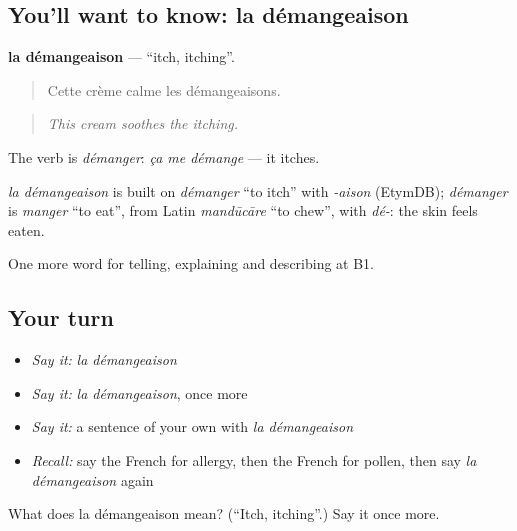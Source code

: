 \subsection*{You'll want to know: la démangeaison}
\textbf{la démangeaison} — \textquotedblleft{}itch, itching\textquotedblright{}.

\begin{quote}
Cette crème calme les démangeaisons.
\end{quote}

\begin{quote}
\emph{This cream soothes the itching.}
\end{quote}

The verb is \emph{démanger}: \emph{ça me démange} — it itches.

\begin{cousinweb}
\emph{la démangeaison} is built on \emph{démanger} \textquotedblleft{}to itch\textquotedblright{} with \emph{-aison} (EtymDB); \emph{démanger} is \emph{manger} \textquotedblleft{}to eat\textquotedblright{}, from Latin \emph{mandūcāre} \textquotedblleft{}to chew\textquotedblright{}, with \emph{dé-}: the skin feels eaten.
\end{cousinweb}

\begin{grammarlens}[title={What you've built}]
One more word for telling, explaining and describing at B1.
\end{grammarlens}

\subsection*{Your turn}
\begin{itemize}
\raggedright
  \item \emph{Say it:} \emph{la démangeaison}
  \item \emph{Say it:} \emph{la démangeaison}, once more
  \item \emph{Say it:} a sentence of your own with \emph{la démangeaison}
  \item \emph{Recall:} say the French for allergy, then the French for pollen, then say \emph{la démangeaison} again
\end{itemize}

\begin{tcolorbox}[breakable,colback=teal!4,colframe=teal!35!black,title={Before you move on}]
What does la démangeaison mean? (\textquotedblleft{}Itch, itching\textquotedblright{}.) Say it once more.
\end{tcolorbox}
